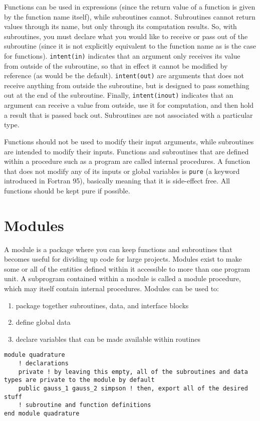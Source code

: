 \documentclass[10pt]{article}
\begin{document}
Functions can be used in expressions (since the return value of a function is given by the function name itself), while subroutines cannot. Subroutines cannot return values through its name, but only through its computation results. So, with subroutines, you must declare what you would like to receive or pass out of the subroutine (since it is not explicitly equivalent to the function name as is the case for functions). {\tt intent(in)} indicates that an argument only receives its value from outside of the subroutine, so that in effect it cannot be modified by reference (as would be the default). {\tt intent(out)} are arguments that does not receive anything from outside the subroutine, but is designed to pass something out at the end of the subroutine. Finally, {\tt intent(inout)} indicates that an argument can receive a value from outside, use it for computation, and then hold a result that is passed back out. Subroutines are not associated with a particular type.

Functions should not be used to modify their input arguments, while subroutines are intended to modify their inputs. Functions and subroutines that are defined within a procedure such as a program are called internal procedures. A function that does not modify any of its inputs or global variables is {\tt pure} (a keyword introduced in Fortran 95), basically meaning that it is side-effect free. All functions should be kept pure if possible.

\section{Modules}
A module is a package where you can keep functions and subroutines that becomes useful for dividing up code for large projects. Modules exist to make some or all of the entities defined within it accessible to more than one program unit. A subprogram contained within a module is called a module procedure, which may itself contain internal procedures. Modules can be used to:

\begin{enumerate}
\item package together subroutines, data, and interface blocks
\item define global data
\item declare variables that can be made available within routines
\end{enumerate}

\begin{lstlisting}
module quadrature
 	! declarations
	private ! by leaving this empty, all of the subroutines and data types are private to the module by default
	public gauss_1 gauss_2 simpson ! then, export all of the desired stuff
	! subroutine and function definitions
end module quadrature
\end{lstlisting}
\end{document}
